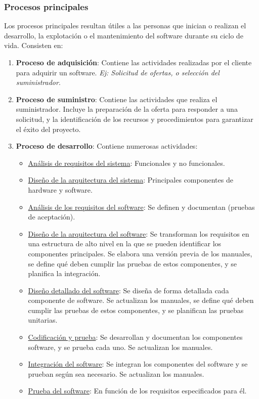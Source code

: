 \subsubsection{Procesos principales}
Los procesos principales resultan útiles a las personas que inician o realizan el desarrollo, la explotación o el mantenimiento del software durante su ciclo de vida. Consisten en:
\begin{enumerate}
    \item \textbf{Proceso de adquisición}: Contiene las actividades realizadas por el cliente para adquirir un software. \textit{Ej: Solicitud de ofertas, o selección del suministrador}.
    \item \textbf{Proceso de suministro}: Contiene las actividades que realiza el suministrador. Incluye la preparación de la oferta para responder a una solicitud, y la identificación de los recursos y procedimientos para garantizar el éxito del proyecto.
    \item\textbf{Proceso de desarrollo}: Contiene numerosas actividades:
    \begin{itemize}
        \item \uline{Análisis de requisitos del sistema}: Funcionales y no funcionales.
        \item \uline{Diseño de la arquitectura del sistema}: Principales componentes de hardware y software.
        \item \uline{Análisis de los requisitos del software}: Se definen y documentan (pruebas de aceptación).
        \item \uline{Diseño de la arquitectura del software}: Se transforman los requisitos en una estructura de alto nivel en la que se pueden identificar los componentes principales. Se elabora una versión previa de los manuales, se define qué deben cumplir las pruebas de estos componentes, y se planifica la integración.
        \item \uline{Diseño detallado del software}: Se diseña de forma detallada cada componente de software. Se actualizan los manuales, se define qué deben cumplir las pruebas de estos componentes, y se planifican las pruebas unitarias.
        \item \uline{Codificación y prueba}: Se desarrollan y documentan los componentes software, y se prueba cada uno. Se actualizan los manuales.
        \item \uline{Integración del software}: Se integran los componentes del software y se prueban según sea necesario. Se actualizan los manuales.
        \item \uline{Prueba del software}: En función de los requisitos especificados para él.

\end{itemize}
\end{enumerate}
